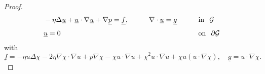 \documentclass[11pt,a4paper]{amsart}
\theoremstyle{remark}
\theoremstyle{definition}
\numberwithin{equation}{section}
\numberwithin{proposition}{section}
\begin{document}
\begin{proof}
\begin{equation}\label{eq_30}
	\begin{aligned}
		&-\eta\Delta \underline{u}+\underline{u}\cdot\nabla\underline{u}+\nabla \underline{p}=\underline{f},&\qquad&\nabla\cdot \underline{u} =\underline{g}&\qquad&\mbox{in}\hspace{.1in}\mathcal{G}\\[3pt]
		&\underline{u}=0&\qquad&&\qquad&\mbox{on}\hspace{.1in}\partial \mathcal{G}
	\end{aligned}
\end{equation}
with \begin{equation*}
\underline{f} =-\eta u\Delta\chi -2 \eta\nabla\chi\cdot \nabla u + p\nabla\chi  -\chi u\cdot\nabla u +\chi^2u\cdot\nabla u+\chi u(u\cdot\nabla\chi), \quad \underline{g}=u\cdot\nabla \chi.
\end{equation*}


\end{proof}
\end{document}
